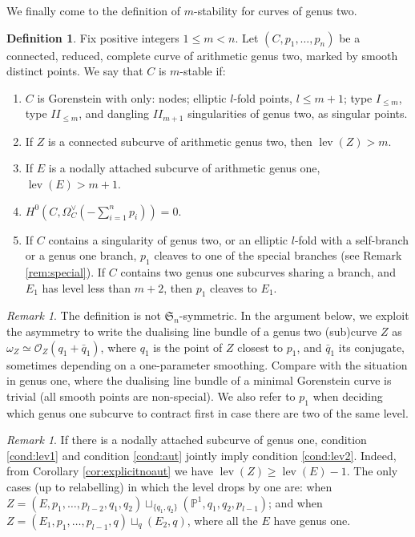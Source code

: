 \documentclass{compositio}
\newcommand{\PP}{\mathbb P}
\newcommand{\OO}{\mathcal O}
\newcommand{\lev}{\operatorname{lev}}
\theoremstyle{plain}
\theoremstyle{definition}
\newtheorem{definition}[thm]{Definition}
\theoremstyle{remark}
\newtheorem{rem}[thm]{Remark}
\begin{document}
We finally come to the definition of $m$-stability for curves of genus two.
\begin{definition}\label{def:m-stability}
 Fix positive integers $1\leq m<n$. Let $(C,p_1,\ldots,p_n)$ be a connected, reduced, complete curve of arithmetic genus two, marked by smooth distinct points. We say that $C$ is $m$-stable if:
 \begin{enumerate}[leftmargin=.7cm]
  \item\label{cond:sing} $C$ is Gorenstein with only: nodes; elliptic $l$-fold points, $l\leq m+1$; type $I_{\leq m}$, type $I\!I_{\leq m}$, and dangling $I\!I_{m+1}$ singularities of genus two, as singular points.
  \item\label{cond:lev2} If $Z$ is a connected subcurve of arithmetic genus two, then $\lev(Z)>m$.
  \item\label{cond:lev1} If $E$ is a nodally attached subcurve of arithmetic genus one, $\lev(E)>m+1$.
  \item\label{cond:aut} $H^0(C,\Omega_C^\vee(-\sum_{i=1}^n p_i))=0$.
  \item\label{cond:p1} If $C$ contains a singularity of genus two, or an elliptic $l$-fold with a self-branch or a genus one branch, $p_1$ cleaves to one of the special branches (see Remark \ref{rem:special}). If $C$ contains two genus one subcurves sharing a branch, and $E_1$ has level less than $m+2$, then $p_1$ cleaves to $E_1$.
 \end{enumerate}
\end{definition}

\begin{rem}
 The definition is not $\mathfrak{S}_n$-symmetric. In the argument below, we exploit the asymmetry to write the dualising line bundle of a genus two (sub)curve $Z$ as $\omega_Z\simeq\OO_Z(q_1+\bar q_1)$, where $q_1$ is the point of $Z$ closest to $p_1$, and $\bar q_1$ its conjugate, sometimes depending on a one-parameter smoothing. Compare with the situation in genus one, where the dualising line bundle of a minimal Gorenstein curve is trivial (all smooth points are non-special). We also refer to $p_1$ when deciding which genus one subcurve to contract first in case there are two of the same level.
\end{rem}

\begin{rem}\label{rmk:lev1solev2}
 If there is a nodally attached subcurve of genus one, condition \eqref{cond:lev1} and condition \eqref{cond:aut} jointly imply condition \eqref{cond:lev2}. Indeed, from Corollary \ref{cor:explicitnoaut} we have $\lev(Z)\geq\lev(E)-1$. The only cases (up to relabelling) in which the level drops by one are: when $Z=(E,p_1,\ldots,p_{l-2},q_1,q_2)\sqcup_{\{q_1,q_2\}}(\PP^1,q_1,q_2,p_{l-1})$; and when $Z=(E_1,p_1,\ldots,p_{l-1},q)\sqcup_q(E_2,q)$, where all the $E$ have genus one.
\end{rem}
\end{document}
